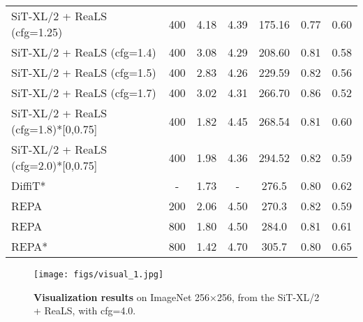 \begin{table}[t]
{\begin{tabular}{lcccccc}
\rowcolor{blue!15} SiT-XL/2 + ReaLS (cfg=1.25)  & 400    & 4.18            & 4.39             & 175.16       & 0.77                & 0.60             \\ 
\rowcolor{blue!15} SiT-XL/2 + ReaLS (cfg=1.4)  & 400    & 3.08            & 4.29             & 208.60       & 0.81                & 0.58             \\ 
\rowcolor{blue!15} SiT-XL/2 + ReaLS (cfg=1.5)  & 400    & 2.83            & 4.26             & 229.59       & 0.82                & 0.56             \\ 
\rowcolor{blue!15} SiT-XL/2 + ReaLS (cfg=1.7)  & 400    & 3.02            & 4.31             & 266.70       & 0.86                & 0.52             \\ 
\rowcolor{blue!15} SiT-XL/2 + ReaLS (cfg=1.8)*[0,0.75]  & 400    & \cellcolor{yellow!20} 1.82            & 4.45             & 268.54       & 0.81                & 0.60             \\ 
\rowcolor{blue!15} SiT-XL/2 + ReaLS (cfg=2.0)*[0,0.75]  & 400    & 1.98            & 4.36             & 294.52       & 0.82                & 0.59             \\ 

\midrule

DiffiT*~\cite{hatamizadeh2025diffit}                    & -       & 1.73            & -                & 276.5        & 0.80                & 0.62             \\ \midrule
REPA~\cite{yu2024representation}           & 200    & 2.06            & 4.50             & 270.3        & 0.82                & 0.59             \\
REPA                       & 800    & 1.80            & 4.50             & 284.0        & 0.81                & 0.61             \\
REPA*                       & 800    & 1.42            & 4.70             & 305.7        & 0.80                & 0.65             \\
\bottomrule
\end{tabular}
}
\vspace{-2em}
\label{tab: FID with cfg}
\end{table}

\begin{figure*}[t]
    \centering
    \texttt{[image: figs/visual\_1.jpg]}
    \vspace{-1em}
    \caption{\textbf{Visualization results} on ImageNet 256×256, from the SiT-XL/2 + ReaLS, with cfg=4.0.}
    \label{fig:visual_1}
    \vspace{-0.5cm}
\end{figure*}


